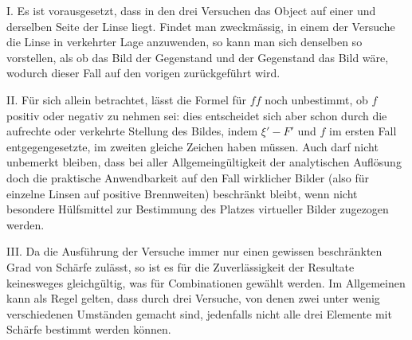 I. Es ist vorausgesetzt, dass in den drei Versuchen das Object auf einer und derselben Seite der Linse liegt. Findet man zweckmässig, in einem der Versuche die Linse in verkehrter Lage anzuwenden, so kann man sich denselben so vorstellen, als ob das Bild der Gegenstand und der Gegenstand das Bild wäre, wodurch dieser Fall auf den vorigen zurückgeführt wird.

II. Für sich allein betrachtet, lässt die Formel für $ff$ noch unbestimmt, ob $f$ positiv oder negativ zu nehmen sei: dies entscheidet sich aber schon durch die aufrechte oder verkehrte Stellung des Bildes, indem $\xi'-F'$ und $f$ im ersten Fall entgegengesetzte, im zweiten gleiche Zeichen haben müssen. Auch darf nicht unbemerkt bleiben, dass bei aller Allgemeingültigkeit der analytischen Auflösung doch die praktische Anwendbarkeit auf den Fall wirklicher Bilder (also für einzelne Linsen auf positive Brennweiten) beschränkt bleibt, wenn nicht besondere Hülfsmittel zur Bestimmung des Platzes virtueller Bilder zugezogen werden.

III. Da die Ausführung der Versuche immer nur einen gewissen beschränkten Grad von Schärfe zulässt, so ist es für die Zuverlässigkeit der Resultate keinesweges gleichgültig, was für Combinationen gewählt werden. Im Allgemeinen kann als Regel gelten, dass durch drei Versuche, von denen zwei unter wenig verschiedenen Umständen gemacht sind, jedenfalls nicht alle drei Elemente mit Schärfe bestimmt werden können.


